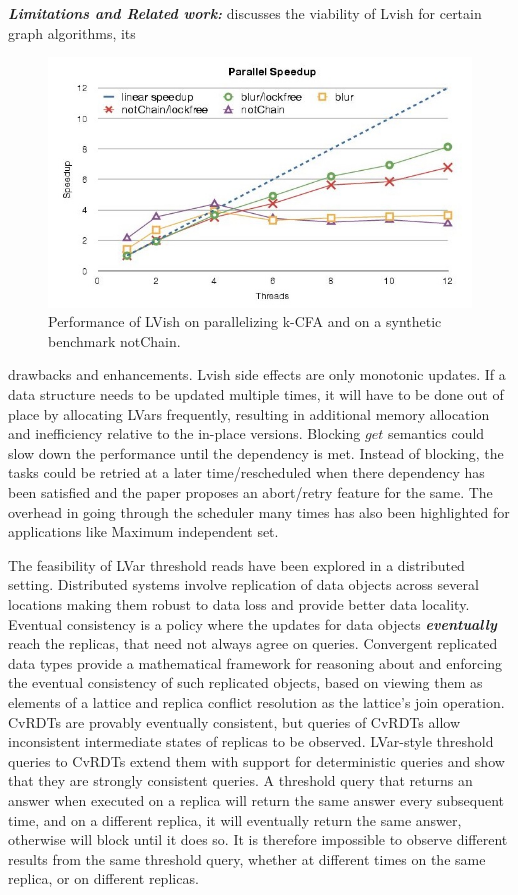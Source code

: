 \documentclass[twocolumn]{article}
\begin{document}
\textbf{\textit{Limitations and Related work:}} \cite{newton1}discusses the viability of Lvish for certain graph algorithms, its
\begin{figure}
\centerline{
\includegraphics[width=1.0\columnwidth]{Figures/speedup.jpg}
}
\caption{Performance of LVish on parallelizing k-CFA\cite{lkuper2} and on a synthetic benchmark notChain.}
\label{Figure2}
\end{figure}
drawbacks and enhancements. Lvish side effects are only monotonic updates. If a data structure needs to be updated multiple times, it will have to be done out of place by allocating LVars frequently, resulting in additional memory allocation and inefficiency relative to the in-place versions. Blocking $get$ semantics could slow down the performance until the dependency is met. Instead of blocking, the tasks could be retried at a later time/rescheduled when there dependency has been satisfied and the paper proposes an abort/retry feature for the same. The overhead in going through the scheduler many times has also been highlighted for applications like Maximum independent set.\\ \par
The feasibility of LVar threshold reads have been explored in a distributed setting\cite{newton2}. Distributed systems involve replication of data objects across several locations making them robust to data loss and provide better data locality. Eventual consistency is a policy where the updates for data objects \textbf{\textit{eventually}} reach the replicas, that need not always agree on queries. Convergent replicated data types provide a mathematical framework for reasoning about and enforcing the eventual consistency of such replicated objects, based on viewing them as elements of a lattice and replica conflict resolution as the lattice's join operation. CvRDTs are provably eventually consistent, but queries of CvRDTs allow inconsistent intermediate states of replicas to be observed. LVar-style threshold queries to CvRDTs extend them with support for deterministic queries and show that they are strongly consistent queries. A threshold query that returns an answer when executed on a replica will return the same answer every subsequent time, and on a different replica, it will eventually return the same answer, otherwise will block until it does so. It is therefore impossible to observe different results from the same threshold query, whether at different times on the same replica, or on different replicas.  
\end{document}
